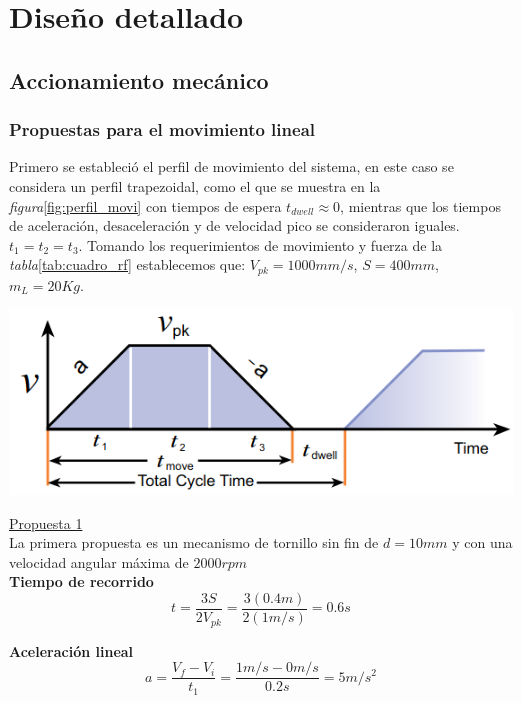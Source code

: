 \section{Diseño detallado}

\subsection{Accionamiento mecánico}
\subsubsection{Propuestas para el movimiento lineal}
Primero se estableció el perfil de movimiento del sistema, en este caso se considera un perfil trapezoidal, como el que se muestra en la \emph{figura}\ref{fig:perfil_movi} con tiempos de espera $t_{dwell}\approx 0$, mientras que los tiempos de aceleración, desaceleración y de velocidad pico se consideraron iguales. $t_1 = t_2 = t_3$.
Tomando los requerimientos de movimiento y fuerza de la \emph{tabla}\ref{tab:cuadro_rf} establecemos que: $V_{pk} = 1000 mm/s$, $S = 400mm$, $m_L = 20Kg$.
\begin{center}
    \includegraphics[scale=0.55]{imagenes/Perfil de movimiento.png}
    \label{fig:perfil_movi}
\end{center}

\underline{Propuesta 1}
\\La primera propuesta es un mecanismo de tornillo sin fin de $d = 10mm$ y con una velocidad angular máxima de $2000 rpm$ \\
\newline
\textbf{Tiempo de recorrido}
\begin{equation}
    t = \frac{3S}{2V_{pk}} = \frac{3(0.4m)}{2(1m/s)} = 0.6s
\end{equation}

\textbf{Aceleración lineal}
\begin{equation}
    a = \frac{V_f-V_i}{t_1} = \frac{1m/s-0m/s}{0.2s}=5m/s^2
\end{equation}

